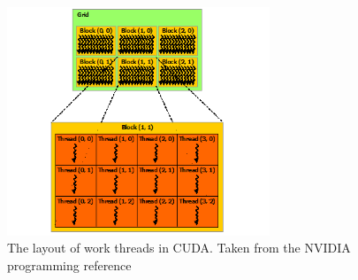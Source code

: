 \begin{figure}[ht!]
 \begin{mdframed}
  \centering
  \includegraphics[width=0.7\textwidth]{images/grid-of-thread-blocks.png}
  \caption[Thread layout in CUDA]{The layout of work threads in CUDA. Taken from the NVIDIA programming reference \cite{cuda}}
  \label{fig_grid_blocks}
 \end{mdframed}
\end{figure}

